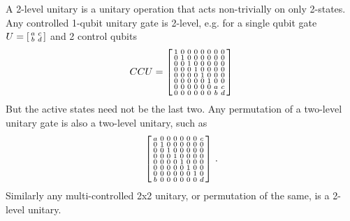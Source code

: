 A 2-level unitary is a unitary operation that acts non-trivially on only 2-states. Any controlled 1-qubit unitary gate is 2-level, e.g. for a single qubit gate $U=\begin{bsmallmatrix}
    a & c \\ 
    b & d        
\end{bsmallmatrix}$  and 2 control qubits
\[
CCU = 
\begin{bsmallmatrix}
    1 & 0 & 0 & 0 & 0 & 0 & 0 & 0 \\ 
    0 & 1 & 0 & 0 & 0 & 0 & 0 & 0 \\ 
    0 & 0 & 1 & 0 & 0 & 0 & 0 & 0 \\ 
    0 & 0 & 0 & 1 & 0 & 0 & 0 & 0 \\ 
    0 & 0 & 0 & 0 & 1 & 0 & 0 & 0 \\ 
    0 & 0 & 0 & 0 & 0 & 1 & 0 & 0 \\ 
    0 & 0 & 0 & 0 & 0 & 0 & a & c \\ 
    0 & 0 & 0 & 0 & 0 & 0 & b & d        
\end{bsmallmatrix}
\]
But the active states need not be the last two. Any permutation of a two-level unitary gate is also a two-level unitary, such as 
\[
\begin{bsmallmatrix}
    a & 0 & 0 & 0 & 0 & 0 & 0 & c \\ 
    0 & 1 & 0 & 0 & 0 & 0 & 0 & 0 \\ 
    0 & 0 & 1 & 0 & 0 & 0 & 0 & 0 \\ 
    0 & 0 & 0 & 1 & 0 & 0 & 0 & 0 \\ 
    0 & 0 & 0 & 0 & 1 & 0 & 0 & 0 \\ 
    0 & 0 & 0 & 0 & 0 & 1 & 0 & 0 \\ 
    0 & 0 & 0 & 0 & 0 & 0 & 1 & 0 \\ 
    b & 0 & 0 & 0 & 0 & 0 & 0 & d        
\end{bsmallmatrix} \ .
\]
Similarly any multi-controlled 2x2 unitary, or permutation of the same, is a 2-level unitary. 


